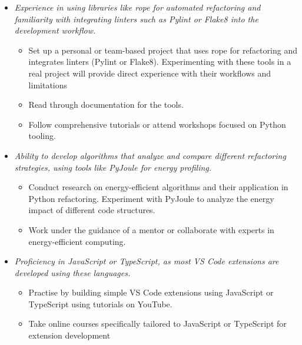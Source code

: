 \documentclass[12pt]{article}
\begin{document}
\begin{enumerate}[wide=0pt, leftmargin=*]
\begin{itemize}
      \item \textit{Experience in using libraries like rope for
          automated refactoring and familiarity with integrating
        linters such as Pylint or Flake8 into the development workflow.}
        \begin{itemize}
          \item Set up a personal or team-based project that uses
            rope for refactoring and integrates linters (Pylint or
            Flake8). Experimenting with these tools in a real project
            will provide direct experience with their workflows and limitations
          \item Read through documentation for the tools.
          \item Follow comprehensive tutorials or attend workshops
            focused on Python tooling.
        \end{itemize}

      \item \textit{Ability to develop algorithms that analyze and
          compare different refactoring strategies, using tools like
        PyJoule for energy profiling.}
        \begin{itemize}
          \item Conduct research on energy-efficient algorithms and
            their application in Python refactoring. Experiment with
            PyJoule to analyze the energy impact of different code structures.
          \item Work under the guidance of a mentor or collaborate
            with experts in energy-efficient computing.
        \end{itemize}

      \item \textit{Proficiency in JavaScript or TypeScript, as most
        VS Code extensions are developed using these languages.}
        \begin{itemize}
          \item Practise by building simple VS Code extensions using
            JavaScript or TypeScript using tutorials on YouTube.
          \item Take online courses specifically tailored to
            JavaScript or TypeScript for extension development
        \end{itemize}

    \end{itemize}


\end{enumerate}
\end{document}

